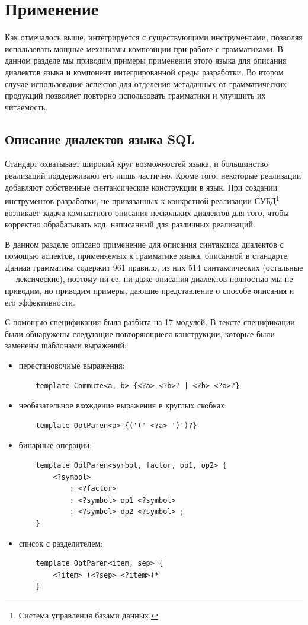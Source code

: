 \chapter{Применение }

Как отмечалось выше, \GRM{} интегрируется с существующими инструментами, позволяя использовать мощные механизмы композиции при работе с грамматиками.
В данном разделе мы приводим примеры применения этого языка для описания диалектов языка  и компонент интегрированной среды разработки. Во втором случае использование аспектов для отделения метаданных от грамматических продукций позволяет повторно использовать грамматики и улучшить их читаемость.

\section{Описание диалектов языка SQL}

Стандарт  \cite{SQL92} охватывает широкий круг возможностей языка, и большинство реализаций поддерживают его лишь частично. Кроме того, некоторые реализации добавляют собственные синтаксические конструкции в язык. При создании инструментов разработки, не привязанных к конкретной реализации СУБД\footnote{Система управления базами данных.} возникает задача компактного описания нескольких диалектов  для того, чтобы корректно обрабатывать код, написанный для различных реализаций.

В данном разделе описано применение \GRM{} для описания синтаксиса диалектов  с помощью аспектов, применяемых к грамматике языка, описанной в стандарте. Данная грамматика содержит 961 правило, из них 514 синтаксических (остальные --- лексические), поэтому ни ее, ни даже описания диалектов полностью мы не приводим, но приводим примеры, дающие представление о способе описания и его эффективности.

С помощью \GRM{} спецификация  была разбита на 17 модулей. В тексте спецификации были обнаружены следующие повторяющиеся конструкции, которые были заменены шаблонами выражений:
\begin{itemize}
\item перестановочные выражения:
\begin{lstlisting}
	template Commute<a, b> {<?a> <?b>? | <?b> <?a>?}
\end{lstlisting}
\item необязательное вхождение выражения в круглых скобках:
\begin{lstlisting}
	template OptParen<a> {('(' <?a> ')')?}
\end{lstlisting}
\item бинарные операции:
\begin{lstlisting}
	template OptParen<symbol, factor, op1, op2> {
		<?symbol>
			: <?factor>
			: <?symbol> op1 <?symbol>
			: <?symbol> op2 <?symbol> ;
	}
\end{lstlisting}
\item список с разделителем:
\begin{lstlisting}
	template OptParen<item, sep> {
		<?item> (<?sep> <?item>)*
	}
\end{lstlisting}
\end{itemize}

